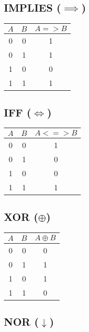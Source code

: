 \begin{multicols}{2}
\vspace{1em}

\subsection*{IMPLIES ($\implies$)}

\begin{tabular}{ccc}
\toprule
$A$ & $B$ & $A => B$ \\
\midrule
0 & 0 & 1 \\
0 & 1 & 1 \\
1 & 0 & 0 \\
1 & 1 & 1 \\
\bottomrule
\end{tabular}

\columnbreak
\subsection*{IFF ($\iff$)}

\begin{tabular}{ccc}
\toprule
$A$ & $B$ & $A <=> B$ \\
\midrule
0 & 0 & 1 \\
0 & 1 & 0 \\
1 & 0 & 0 \\
1 & 1 & 1 \\
\bottomrule
\end{tabular}

\vspace{1em}

\subsection*{XOR ($\oplus$)}

\begin{tabular}{ccc}
\toprule
$A$ & $B$ & $A \oplus B$ \\
\midrule
0 & 0 & 0 \\
0 & 1 & 1 \\
1 & 0 & 1 \\
1 & 1 & 0 \\
\bottomrule
\end{tabular}

\vspace{1em}

\subsection*{NOR ($\downarrow$)}


\end{multicols}
